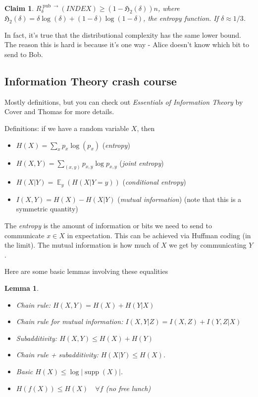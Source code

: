 \documentclass[11pt]{article}
\DeclareMathOperator*{\E}{\mathbb{E}}
\newtheorem{lemma}[theorem]{Lemma}
\newtheorem{claim}[theorem]{Claim}
\newcommand{\on}{\operatorname}
\begin{document}
\begin{claim}
  $R^{\on{pub} \rightarrow}_\delta(INDEX) \geq (1 - \mathfrak{H}_2(\delta))n$, where $\mathfrak{H}_2(\delta) = \delta\log (\delta) + (1 - \delta)\log(1 - \delta)$, the entropy function. If $\delta \approx 1/3$. 
\end{claim}

In fact, it's true that the distributional complexity has the same lower bound. The reason this is hard is because it's one way - Alice doesn't know which bit to send to Bob. 

\subsection{Information Theory crash course}

Mostly definitions, but you can check out \emph{Essentials of Information Theory} by Cover and Thomas for more details.

Definitions: if we have a random variable $X$, then 
\begin{itemize}
  \item $H(X) = \sum_x p_x \log(p_x)$ (\emph{entropy})
  \item $H(X, Y) = \sum_{(x, y)}p_{x, y}\log p_{x, y}$ (\emph{joint entropy})
  \item $H(X|Y) = \E_y(H(X | Y = y))$ (\emph{conditional entropy})
  \item $I(X, Y) = H(X) - H(X|Y)$ (\emph{mutual information}) (note that this is a symmetric quantity)
\end{itemize}
The \emph{entropy} is the amount of information or bits we need to send to communicate $x \in X$ in expectation. This can be achieved via Huffman coding (in the limit). The mutual information is how much of $X$ we get by communicating $Y$.

\smallskip

Here are some basic lemmas involving these equalities
\begin{lemma}
  \
  \begin{itemize}
    \item Chain rule: $H(X, Y) = H(X) + H(Y|X)$ 
    \item Chain rule for mutual information: $I(X, Y|Z) = I(X, Z) + I(Y, Z|X)$
    \item Subadditivity: $H(X, Y) \leq H(X) + H(Y)$ 
    \item Chain rule + subadditivity: $H(X|Y) \leq H(X)$.
    \item Basic $H(X) \leq \log|\on{supp}(X)|$.
    \item $H(f(X)) \leq H(X) \quad \forall f$ (no free lunch)
  \end{itemize}
\end{lemma}
\end{document}

